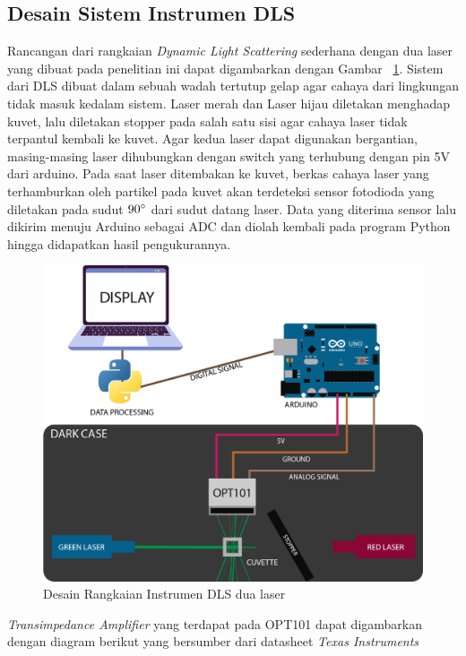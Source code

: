 \subsection{Desain Sistem Instrumen DLS}

Rancangan dari rangkaian \textit{Dynamic Light Scattering} sederhana dengan dua laser yang
dibuat pada penelitian ini dapat digambarkan dengan Gambar ~\ref{fig:schemacirc}. Sistem dari
DLS dibuat dalam sebuah wadah tertutup gelap agar cahaya dari lingkungan tidak masuk kedalam
sistem. Laser merah dan Laser hijau diletakan menghadap kuvet, lalu diletakan stopper pada
salah satu sisi agar cahaya laser tidak terpantul kembali ke kuvet. Agar kedua laser dapat
digunakan bergantian, masing-masing laser dihubungkan dengan switch yang terhubung
dengan pin 5V dari arduino. Pada saat laser ditembakan ke kuvet, berkas cahaya laser yang
terhamburkan oleh partikel pada kuvet akan terdeteksi sensor fotodioda yang diletakan pada
sudut ${90\degree}$ dari sudut datang laser. Data yang diterima sensor lalu dikirim menuju Arduino
sebagai ADC dan diolah kembali pada program Python hingga didapatkan hasil pengukurannya.
\begin{figure}[H]
    \centering
    \includegraphics[width=14cm]{Images/Schema.png}
    \caption{Desain Rangkaian Instrumen DLS dua laser}
    \label{fig:schemacirc}
\end{figure}
\noindent
\textit{Transimpedance Amplifier} yang terdapat pada OPT101 dapat digambarkan dengan
diagram berikut yang bersumber dari datasheet \textit{Texas Instruments}

